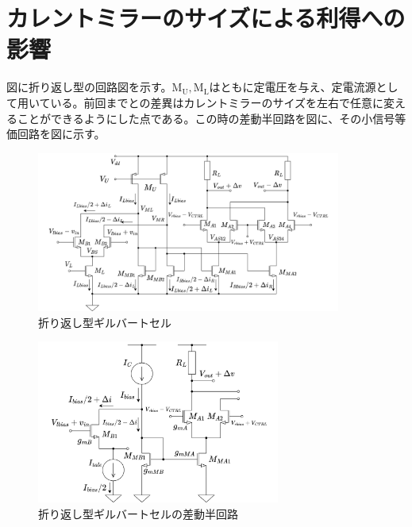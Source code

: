 \documentclass[twocolumn]{jsarticle}
\begin{document}
\section{カレントミラーのサイズによる利得への影響}
    図に折り返し型の回路図を示す。$\mathrm{M_{U},M_{L}}$はともに定電圧を与え、定電流源として用いている。前回までとの差異はカレントミラーのサイズを左右で任意に変えることができるようにした点である。この時の差動半回路を図に、その小信号等価回路を図に示す。
    \begin{figure}[H]
        \begin{center}
            \includegraphics*[width = 100mm]{figures/NtoNFolded.png}
            \caption{折り返し型ギルバートセル}
            \label{fig:NtoN}
        \end{center}
    \end{figure}
    \begin{figure}[H]
        \begin{center}
            \includegraphics*[width = 80mm]{figures/NtoNHalfDiff.png}
            \caption{折り返し型ギルバートセルの差動半回路}
            \label{fig:NtoNhalf}
        \end{center}
    \end{figure}
\end{document}
